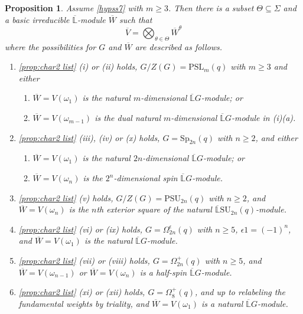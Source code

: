 \documentclass[12pt]{amsart}
\newtheorem{proposition}[theorem]{Proposition}
\theoremstyle{remark}
\theoremstyle{notation}
\theoremstyle{definition}
\newcommand{\SU}{\mathrm{SU}}
\newcommand{\Sp}{\mathrm{Sp}}
\newcommand{\PSU}{\mathrm{PSU}}
\newcommand{\0}{\emptyset}
\newcommand{\PSL}{\mathrm{PSL}}
\begin{document}
\begin{proposition}\label{the new list} Assume \cref{hypss7} with $m \ge 3$.    Then
there is a subset $\Theta \subseteq \Sigma$ and a basic irreducible $\overline{\mathbb L}$-module $\overline{W}$ such that
$$\overline{V}= \bigotimes_{\theta \in \Theta} \overline{W}^{\theta}$$
where the possibilities for $G$ and $\overline{W}$ are described as follows.
\begin{enumerate}
\item \cref{prop:char2 list} (i) or (ii) holds, $G/Z(G)=\PSL_m(q)$ with $m \ge 3$  and either\begin{enumerate} \item $\overline{W}=V(\omega_1)$ is the natural $m$-dimensional $\overline{\mathbb L}G$-module; or\item $\overline{W}=V(\omega_{m-1})$ is the dual natural $m$-dimensional $\overline{\mathbb L}G$-module in (i)(a).\end{enumerate}
\item \cref{prop:char2 list} (iii), (iv) or (x) holds, $G = \Sp_{2n}(q)$ with $n \ge 2$,    and  either\begin{enumerate} \item $\overline{W}=V(\omega_1)$ is the natural $2n$-dimensional $\overline{\mathbb L}G$-module; or\item $\overline{W}=V(\omega_{n})$ is the $2^n$-dimensional spin  $\overline{\mathbb L}G$-module.\end{enumerate}
\item \cref{prop:char2 list} (v) holds, $G/Z(G)= \PSU_{2n}(q)$ with $n \ge 2$,  and $\overline{W}= V(\omega_n)$ is the  $n$th  exterior square of the natural $\overline{\mathbb L}\SU_{2n}(q)$-module.
\item   \cref{prop:char2 list} (vi) or (ix) holds, $G = \Omega_{2n}^\epsilon(q)$ with $n \ge 5$, $\epsilon 1= (-1)^n$,   and $\overline{W}= V(\omega_1)$ is the natural $\overline{\mathbb L}G$-module.
\item   \cref{prop:char2 list} (vii) or (viii) holds, $G = \Omega_{2n}^+(q)$ with $n \ge 5$,   and $\overline{W}= V(\omega_{n-1})$ or $\overline{W}=V(\omega_{n}) $ is a half-spin $\overline{\mathbb L}G$-module.
\item  \cref{prop:char2 list} (xi) or (xii) holds, $G = \Omega_{8}^+(q)$, and up to relabeling the fundamental weights by triality, and $\overline{W}=V(\omega_1)$ is a natural $\overline{\mathbb L}G$-module.
\end{enumerate}
\end{proposition}
\end{document}
